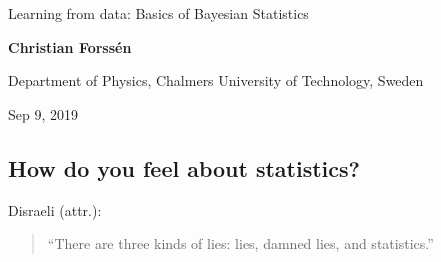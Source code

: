 \documentclass[%
oneside,                 %
final,                   %
10pt]{article}
\newenvironment{block_mdfboxadmon}[1][]{
\begin{block_mdfboxmdframed}[frametitle=#1]
}
{
\end{block_mdfboxmdframed}
}
\begin{document}

\newcommand{\exercisesection}[1]{\subsection*{#1}}







\thispagestyle{empty}

\begin{center}
{\LARGE\bf
\begin{spacing}{1.25}
Learning from data: Basics of Bayesian Statistics
\end{spacing}
}
\end{center}


\begin{center}
{\bf Christian Forssén}
\end{center}

    \begin{center}
\centerline{{\small Department of Physics, Chalmers University of Technology, Sweden}}
\end{center}
    

\begin{center}
Sep 9, 2019
\end{center}

\vspace{1cm}


\subsection{How do you feel about statistics?}

\begin{block_mdfboxadmon}[]
Disraeli (attr.): 

\begin{quote}
“There are three kinds of lies: lies, damned lies, and statistics.”
\end{quote}
\end{block_mdfboxadmon} %
\end{document}
